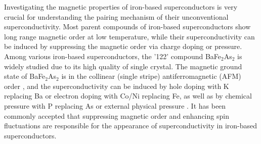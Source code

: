 \documentclass[twocolumn,aps,showpacs,prb]{revtex4-1}
\begin{document}
Investigating the magnetic properties of iron-based superconductors is very crucial for understanding the pairing mechanism of their unconventional superconductivity\cite{1Scalapino(2012)RMP}. Most parent compounds of iron-based superconductors show long range magnetic order at low temperature, while their superconductivity can be induced by suppressing the magnetic order via charge doping or pressure. Among various iron-based superconductors, the '122' compound BaFe$_{2}$As$_{2}$ is widely studied due to its high quality of single crystal\cite{2Johnston(2010)AIP,3GStewart(2011)RMP}. The magnetic ground state of BaFe$_{2}$As$_{2}$ is in the collinear (single stripe) antiferromagnetic (AFM) order \cite{4PDai(2012)NP}, and the superconductivity can be induced by hole doping\cite{5HChen(2009)EPL} with K replacing Ba or electron doping\cite{6(Codoping)NandiS(2010)PRL,7(Nidoping)LiLJ(2009)NJP} with Co/Ni replacing Fe, as well as by chemical pressure\cite{8SJiang(2009)JPCM} with P replacing As or external physical pressure \cite{9ColombierE(2009)PRB,10Ishikawa(2009)PRB,11KimberS(2009)NM}. It has been commonly accepted that suppressing magnetic order and enhancing spin fluctuations are responsible for the appearance of superconductivity in iron-based superconductors\cite{12TImai(2009)PRL}.
\end{document}
